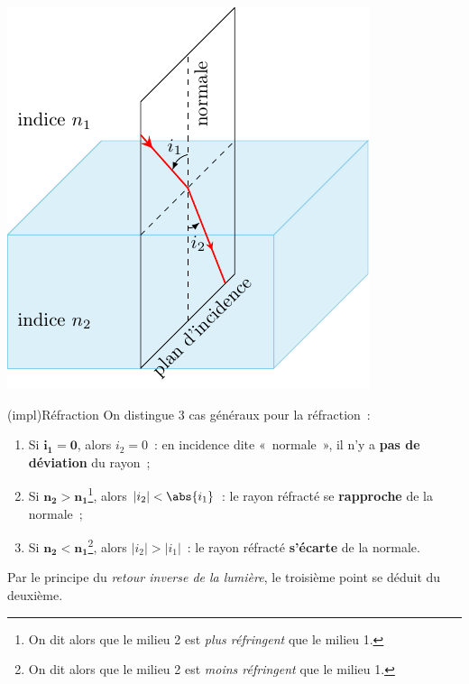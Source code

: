 \documentclass[../../main/main.tex]{subfiles}
\begin{document}
\begin{tcb}[label=loi:snelldescartes]
\begin{minipage}{0.45\linewidth}
\begin{center}
			\includegraphics[width=\linewidth]{snell_refr_nsup}
			\label{fig:snell_refl}
		\end{center}
	\end{minipage}
\end{tcb}

\begin{tcb}[label=impl:refr](impl){Réfraction}
	On distingue 3 cas généraux pour la réfraction~:
	\begin{enumerate}

		\item Si $\mathbf{i_1 = 0}$, alors $i_2 = 0$~: en incidence dite
		      «~normale~», il n'y a \textbf{pas de déviation} du rayon~;
		\item Si $\mathbf{n_2 > n_1}$\footnote{On dit alors que le milieu 2 est
			      \textit{plus réfringent} que le milieu 1.}, alors $ \left| i_2
			      \right| < \abs{i_1} $~: le rayon réfracté se \textbf{rapproche} de
		      la normale~;
		\item Si $\mathbf{n_2 < n_1}$\footnote{On dit alors que le milieu 2 est
			      \textit{moins réfringent} que le milieu 1.}, alors $|i_2| > |i_1|$~:
		      le rayon réfracté \textbf{s'écarte} de la normale.
	\end{enumerate}
	Par le principe du \textit{retour inverse de la lumière}, le troisième point
	se déduit du deuxième.
\end{tcb}
\end{document}
